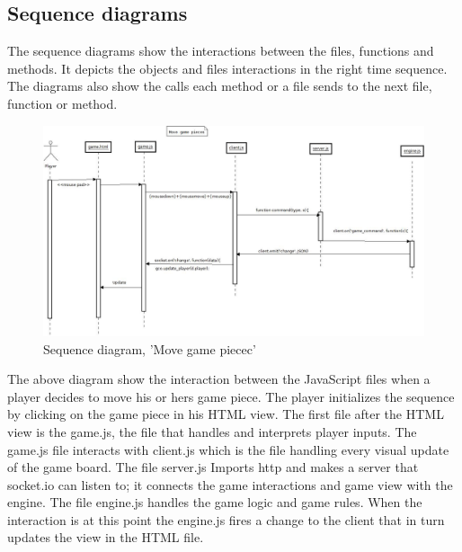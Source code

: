 \subsection{Sequence diagrams}

The sequence diagrams show the interactions between the files, functions and methods. It depicts the objects and files interactions in the right time sequence. The diagrams also show the calls each method or a file sends to the next file, function or method.  \\


\begin{figure}[H]
  \centering
    \includegraphics[width=1.0\textwidth]{img/movegamepiececsekvensdiagram.jpeg}
  \caption{Sequence diagram, 'Move game piecec'} 
  \label{fig:movegamepieceseq}
\end{figure}

The above diagram show the interaction between the JavaScript  files when a player decides to move his or hers game piece. The player initializes the sequence by clicking on the game piece in his HTML view. The first file after the HTML view is the game.js, the file that handles and interprets player inputs. The game.js file interacts with client.js which is the file handling every visual update of the game board. The file server.js Imports http and makes a server that socket.io can listen to; it connects the game interactions and game view with the engine. The file engine.js handles the game logic and game rules. When the interaction is at this point the engine.js fires a change to the client that in turn updates the view in the HTML file.\\


